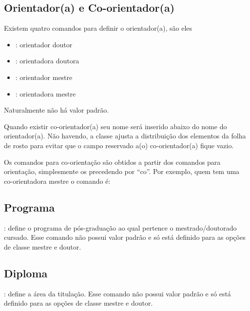 \exemplo {}


\subsection{Orientador(a) e Co-orientador(a)}

Existem quatro comandos para definir o orientador(a), são eles
\begin{itemize}
   \item {}: orientador doutor
   \item {}: orientadora doutora
   \item {}: orientador mestre
   \item {}: orientadora mestre
\end{itemize}
Naturalmente não há valor padrão.


Quando existir co-orientador(a) seu nome será inserido abaixo do nome
do orientador(a). Não havendo, a classe ajusta a distribuição dos
elementos da folha de rosto para evitar que o campo reservado a(o)
co-orientador(a) fique vazio.

Os comandos para co-orientação são obtidos a partir dos comandos
para orientação, simplesmente os precedendo por ``co''. Por exemplo,
quem tem uma co-orientadora mestre o comando é:

\exemplo{}

\subsection{Programa}

: define o programa de pós-graduação
ao qual pertence o mestrado/doutorado cursado. Esse comando não possui 
valor padrão e só está definido para as opções de classe mestre e doutor.

\exemplo{}

\subsection{Diploma}

: define a área da titulação.
Esse comando não possui valor padrão e só está definido para as opções de classe mestre e doutor.

